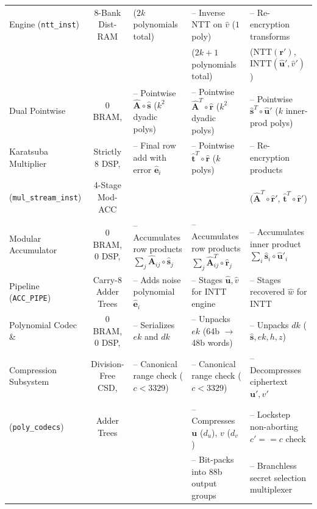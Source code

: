 \begin{table}[!t]
\begin{tabular}{@{} l c p{4.2cm} p{4.2cm} p{4.5cm} @{}}
Engine (\texttt{ntt\_inst}) & 8-Bank Dist-RAM & \quad ($2k$ polynomials total) & -- Inverse NTT on $\hat{v}$ ($1$ poly) & -- Re-encryption transforms \\
& & & \quad ($2k + 1$ polynomials total) & \quad ($\text{NTT}(\mathbf{r}')$, $\text{INTT}(\hat{\mathbf{u}}', \hat{v}')$) \\
\addlinespace[3pt]
Dual Pointwise & 0 BRAM, & -- Pointwise $\hat{\mathbf{A}} \circ \hat{\mathbf{s}}$ ($k^2$ dyadic polys) & -- Pointwise $\hat{\mathbf{A}}^T \circ \hat{\mathbf{r}}$ ($k^2$ dyadic polys) & -- Pointwise $\hat{\mathbf{s}}^T \circ \hat{\mathbf{u}}'$ ($k$ inner-prod polys) \\
Karatsuba Multiplier & Strictly 8 DSP, & -- Final row add with error $\hat{\mathbf{e}}_i$ & -- Pointwise $\hat{\mathbf{t}}^T \circ \hat{\mathbf{r}}$ ($k$ polys) & -- Re-encryption products \\
(\texttt{mul\_stream\_inst}) & 4-Stage Mod-ACC & & & \quad ($\hat{\mathbf{A}}^T \circ \hat{\mathbf{r}}'$, $\hat{\mathbf{t}}^T \circ \hat{\mathbf{r}}'$) \\
\addlinespace[3pt]
Modular Accumulator & 0 BRAM, 0 DSP, & -- Accumulates row products $\sum_j \hat{\mathbf{A}}_{ij}\circ\hat{\mathbf{s}}_j$ & -- Accumulates row products $\sum_j \hat{\mathbf{A}}^T_{ij}\circ\hat{\mathbf{r}}_j$ & -- Accumulates inner product $\sum_i \hat{\mathbf{s}}_i \circ \hat{\mathbf{u}}'_i$ \\
Pipeline (\texttt{ACC\_PIPE}) & Carry-8 Adder Trees & -- Adds noise polynomial $\hat{\mathbf{e}}_i$ & -- Stages $\hat{\mathbf{u}}, \hat{v}$ for INTT engine & -- Stages recovered $\hat{w}$ for INTT \\
\addlinespace[3pt]
Polynomial Codec \& & 0 BRAM, 0 DSP, & -- Serializes $ek$ and $dk$ & -- Unpacks $ek$ (64b $\to$ 48b words) & -- Unpacks $dk$ ($\hat{\mathbf{s}}, ek, h, z$) \\
Compression Subsystem & Division-Free CSD, & -- Canonical range check ($c < 3329$) & -- Canonical range check ($c < 3329$) & -- Decompresses ciphertext $\mathbf{u}', v'$ \\
(\texttt{poly\_codecs}) & Adder Trees & & -- Compresses $\mathbf{u}$ ($d_u$), $v$ ($d_v$) & -- Lockstep non-aborting $c' == c$ check \\
& & & -- Bit-packs into 88b output groups & -- Branchless secret selection multiplexer \\
\bottomrule
\end{tabular}
\end{table}

